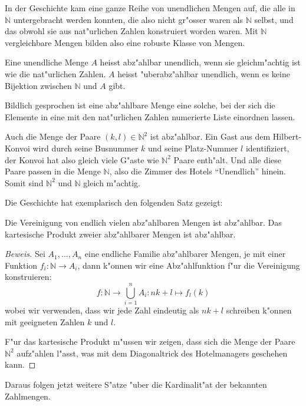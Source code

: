 In der Geschichte kam eine ganze Reihe von unendlichen Mengen auf, die
alle in $\mathbb N$ untergebracht werden konnten, die also nicht
gr"osser waren als $\mathbb N$ selbst, und das obwohl sie aus nat"urlichen
Zahlen konstruiert worden waren. Mit $\mathbb N$ vergleichbare Mengen
bilden also eine robuste Klasse von Mengen.

\begin{definition}
Eine unendliche Menge $A$ heisst abz"ahlbar unendlich, wenn sie 
gleichm"achtig ist wie die nat"urlichen Zahlen. $A$ heisst
"uberabz"ahlbar unendlich, wenn es keine Bijektion zwischen
$\mathbb N$ und $A$ gibt.
\end{definition}
Bildlich gesprochen ist eine abz"ahlbare Menge eine solche,
bei der sich die Elemente in eine mit den nat"urlichen Zahlen numerierte
Liste einordnen lassen.

Auch die Menge der Paare $(k,l)\in \mathbb N^2$ ist abz"ahlbar.
Ein Gast aus dem Hilbert-Konvoi wird durch seine Busnummer $k$ und
seine Platz-Nummer $l$ identifiziert, der Konvoi hat also gleich
viele G"aste wie $\mathbb N^2$ Paare enth"alt. Und alle diese Paare
passen in die Menge $\mathbb N$, also die Zimmer des Hotels ``Unendlich''
hinein. Somit sind $\mathbb N^2$ und $\mathbb N$ gleich m"achtig.

Die Geschichte hat exemplarisch den folgenden Satz gezeigt:

\begin{satz}Die Vereinigung von endlich vielen abz"ahlbaren
Mengen ist abz"ahlbar. Das kartesische Produkt zweier abz"ahlbarer
Mengen ist abz"ahlbar.
\end{satz}

\begin{proof}[Beweis]
Sei $A_1,\dots,A_n$ eine endliche Familie abz"ahlbarer Mengen,
je mit einer Funktion $f_i\colon \mathbb N\to A_i$, dann
k"onnen wir eine Abz"ahlfunktion f"ur die Vereinigung konstruieren:
\[
f\colon \mathbb N\to\bigcup_{i=1}^n A_i\colon nk+l \mapsto f_l(k)
\]
wobei wir verwenden, dass wir jede Zahl eindeutig als $nk+l$
schreiben k"onnen mit geeigneten Zahlen $k$ und $l$.

F"ur das kartesische Produkt m"ussen wir zeigen, dass sich die
Menge der Paare $\mathbb N^2$ aufz"ahlen l"asst, was mit dem
Diagonaltrick des Hotelmanagers geschehen kann.
\end{proof}

Daraus folgen jetzt weitere S"atze "uber die Kardinalit"at
der bekannten Zahlmengen.

